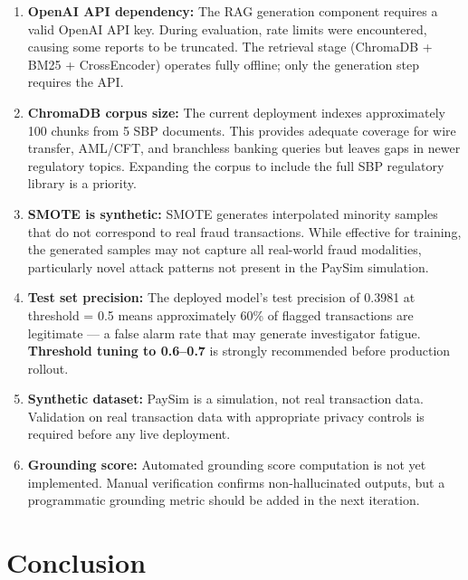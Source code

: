 \documentclass[12pt,a4paper]{article}
\begin{document}
\begin{enumerate}
  \item \textbf{OpenAI API dependency:} The RAG generation component requires a valid OpenAI API key. During evaluation, rate limits were encountered, causing some reports to be truncated. The retrieval stage (ChromaDB + BM25 + CrossEncoder) operates fully offline; only the generation step requires the API.

  \item \textbf{ChromaDB corpus size:} The current deployment indexes approximately 100 chunks from 5 SBP documents. This provides adequate coverage for wire transfer, AML/CFT, and branchless banking queries but leaves gaps in newer regulatory topics. Expanding the corpus to include the full SBP regulatory library is a priority.

  \item \textbf{SMOTE is synthetic:} SMOTE generates interpolated minority samples that do not correspond to real fraud transactions. While effective for training, the generated samples may not capture all real-world fraud modalities, particularly novel attack patterns not present in the PaySim simulation.

  \item \textbf{Test set precision:} The deployed model's test precision of 0.3981 at threshold = 0.5 means approximately 60\% of flagged transactions are legitimate --- a false alarm rate that may generate investigator fatigue. \textbf{Threshold tuning to 0.6--0.7} is strongly recommended before production rollout.

  \item \textbf{Synthetic dataset:} PaySim is a simulation, not real transaction data. Validation on real transaction data with appropriate privacy controls is required before any live deployment.

  \item \textbf{Grounding score:} Automated grounding score computation is not yet implemented. Manual verification confirms non-hallucinated outputs, but a programmatic grounding metric should be added in the next iteration.
\end{enumerate}

\section{Conclusion}
\end{document}

